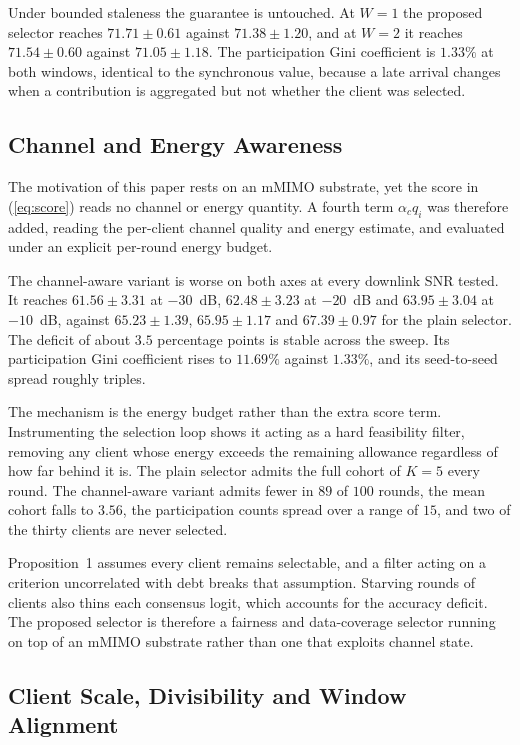 \documentclass[journal]{IEEEtran}
\newcommand{\rev}[1]{#1}
\begin{document}
\rev{Under bounded staleness the guarantee is untouched. At $W = 1$ the proposed selector reaches $71.71 \pm 0.61$ against $71.38 \pm 1.20$, and at $W = 2$ it reaches $71.54 \pm 0.60$ against $71.05 \pm 1.18$. The participation Gini coefficient is $1.33\%$ at both windows, identical to the synchronous value, because a late arrival changes when a contribution is aggregated but not whether the client was selected.}

\subsection{Channel and Energy Awareness}
\label{ssec:exp-channel-aware}

\rev{The motivation of this paper rests on an mMIMO substrate, yet the score in (\ref{eq:score}) reads no channel or energy quantity. A fourth term $\alpha_c q_i$ was therefore added, reading the per-client channel quality and energy estimate, and evaluated under an explicit per-round energy budget.}

\rev{The channel-aware variant is worse on both axes at every downlink SNR tested. It reaches $61.56 \pm 3.31$ at $-30$~dB, $62.48 \pm 3.23$ at $-20$~dB and $63.95 \pm 3.04$ at $-10$~dB, against $65.23 \pm 1.39$, $65.95 \pm 1.17$ and $67.39 \pm 0.97$ for the plain selector. The deficit of about $3.5$ percentage points is stable across the sweep. Its participation Gini coefficient rises to $11.69\%$ against $1.33\%$, and its seed-to-seed spread roughly triples.}

\rev{The mechanism is the energy budget rather than the extra score term. Instrumenting the selection loop shows it acting as a hard feasibility filter, removing any client whose energy exceeds the remaining allowance regardless of how far behind it is. The plain selector admits the full cohort of $K = 5$ every round. The channel-aware variant admits fewer in $89$ of $100$ rounds, the mean cohort falls to $3.56$, the participation counts spread over a range of $15$, and two of the thirty clients are never selected.}

\rev{Proposition~1 assumes every client remains selectable, and a filter acting on a criterion uncorrelated with debt breaks that assumption. Starving rounds of clients also thins each consensus logit, which accounts for the accuracy deficit. The proposed selector is therefore a fairness and data-coverage selector running on top of an mMIMO substrate rather than one that exploits channel state.}

\subsection{Client Scale, Divisibility and Window Alignment}
\label{ssec:exp-scale}
\end{document}
